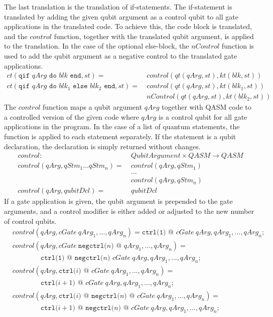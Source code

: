 The last translation is the translation of if-statements. The if-statement is translated by adding the given qubit argument as a control qubit to all gate applications in the translated code. To achieve this, the code block is translated, and the $control$ function, together with the translated qubit argument, is applied to the translation. In the case of the optional else-block, the $nControl$ function is used to add the qubit argument as a negative control to the translated gate applications.
\begin{align*}
        ct(\texttt{qif } qArg \texttt{ do } blk \texttt{ end}, st) = \ 
            &  control(qt(qArg, st), kt(blk, st)) \\
        ct(\texttt{qif } qArg \texttt{ do } blk_1 \texttt{ else } blk_2 \texttt{ end}, st) = \ 
            &  control(qt(qArg, st), kt(blk_1, st)) \\
            &  nControl(qt(qArg, st), kt(blk_2, st))
\end{align*}
The $control$ function maps a qubit argument $qArg$ together with QASM code to a controlled version of the given code where $qArg$ is a control qubit for all gate applications in the program. In the case of a list of quantum statements, the function is applied to each statement separately. If the statement is a qubit declaration, the declaration is simply returned without changes.
\begin{align*}
    control : \ & QubitArgument \times QASM \to QASM\\
    control(qArg, qStm_1 \dots qStm_n) = \ & control(qArg, qStm_1)\\
        & ...\\
        & control(qArg, qStm_n)\\
    control(qArg, qubitDcl) = \ & qubitDcl
\end{align*}
If a gate application is given, the qubit argument is prepended to the gate arguments, and a control modifier is either added or adjusted to the new number of control qubits.
\begin{align*}
    &control(qArg, cGate \ qArg_1, \dots, qArg_n ) =  \texttt{ctrl(1) @ } cGate \ qArg, qArg_1, \dots, qArg_n\texttt{;}\\
    &control(qArg, cGate \ \texttt{negctrl(}n\texttt{) @ } qArg_1, \dots, qArg_n ) = \\
    & \quad \quad \quad \quad \texttt{ctrl(1) @ } \texttt{negctrl(}n\texttt{) }cGate \ qArg, qArg_1, \dots, qArg_n\texttt{;}\\
    &control(qArg, \texttt{ctrl(}i \texttt{) @ } cGate \ qArg_1, \dots, qArg_n ) = \\
    & \quad \quad \quad \quad \texttt{ctrl(}i+1 \texttt{) @ } cGate \ qArg, qArg_1, \dots, qArg_n\texttt{;}\\
    &control(qArg, \texttt{ctrl(}i \texttt{) @ } \texttt{negctrl(}n\texttt{) @ } cGate \ qArg_1, \dots, qArg_n ) = \\
    & \quad \quad \quad \quad \texttt{ctrl(}i+1 \texttt{) @ } \texttt{negctrl(}n\texttt{) @ } cGate \ qArg, qArg_1, \dots, qArg_n\texttt{;}
\end{align*}
